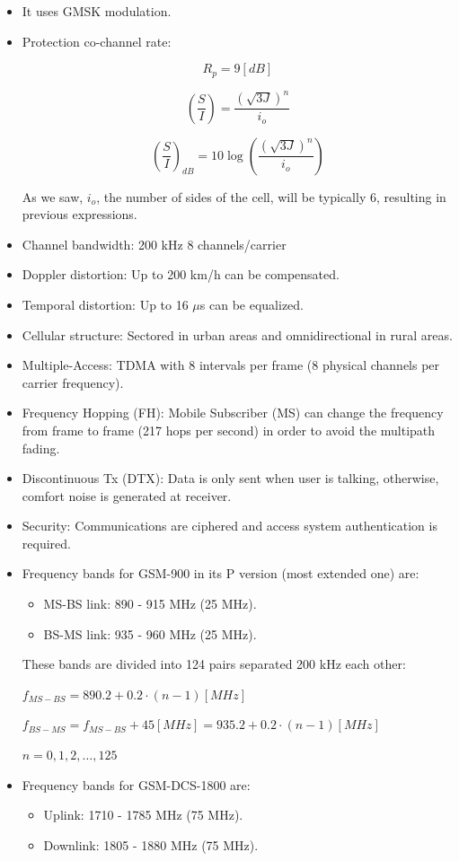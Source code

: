 \documentclass[../main.tex]{subfiles}
\begin{document}
\begin{itemize}
	\item It uses GMSK modulation.
	\item {
		Protection co-channel rate:

		$$
			R_p = 9 [dB]
		$$

		$$
			\left( \frac{S}{I} \right) = \frac {(\sqrt{3 J})^n} {i_o}
		$$

		$$
			\left( \frac{S}{I} \right)_{dB} = 10 \log \left( \frac {(\sqrt{3 J})^n} {i_o} \right)
		$$

		As we saw, $i_o$, the number of sides of the cell, will be typically 6, resulting in previous expressions.
	}
	\item Channel bandwidth: 200 kHz 8 channels/carrier
	\item Doppler distortion: Up to 200 km/h can be compensated.
	\item Temporal distortion: Up to 16 $\mu$s can be equalized.
	\item Cellular structure: Sectored in urban areas and omnidirectional in rural areas.
	\item Multiple-Access: TDMA with 8 intervals per frame (8 physical channels per carrier frequency).
	\item Frequency Hopping (FH): Mobile Subscriber (MS) can change the frequency from frame to frame (217 hops per second) in order to avoid the multipath fading.
	\item Discontinuous Tx (DTX): Data is only sent when user is talking, otherwise, comfort noise is generated at receiver.
	\item Security: Communications are ciphered and access system authentication is required.
	\item {
		Frequency bands for GSM-900 in its P version (most extended one) are:
		\begin{itemize}
			\item MS-BS link: 890 - 915 MHz (25 MHz).
			\item BS-MS link: 935 - 960 MHz (25 MHz).
		\end{itemize}
		These bands are divided into 124 pairs separated 200 kHz each other:

		$f_{MS-BS} = 890.2 + 0.2 \cdot (n - 1) [MHz]$

		$f_{BS-MS} = f_{MS-BS} + 45 [MHz] = 935.2 + 0.2 \cdot (n - 1) [MHz]$

		$n = 0, 1, 2, \ldots, 125$
	}
	\item {
		Frequency bands for GSM-DCS-1800 are:
		\begin{itemize}
			\item Uplink: 1710 - 1785 MHz (75 MHz).
			\item Downlink: 1805 - 1880 MHz (75 MHz).
		\end{itemize}
	}
\end{itemize}
\end{document}
